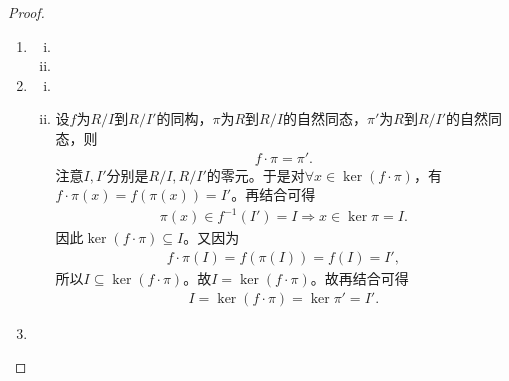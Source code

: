 \documentclass[../../main.tex]{subfiles}%
\begin{document}
\begin{proof}
\begin{enumerate}[(1)]
\item \begin{enumerate}[(i)]
\item 

\item 
\end{enumerate}


\item \begin{enumerate}[(i)]
\item 

\item 设$f$为$R/I$到$R/I'$的同构，$\pi$为$R$到$R/I$的自然同态，$\pi'$为$R$到$R/I'$的自然同态，则
\begin{align*}
f\cdot \pi =\pi'.
\end{align*}
注意$I,I'$分别是$R/I,R/I'$的零元。于是对$\forall x\in \ker\left( f\cdot \pi \right)$，有$f\cdot \pi \left( x \right) =f\left( \pi \left( x \right) \right) =I'$。再结合可得
\begin{align*}
\pi \left( x \right) \in f^{-1}\left( I' \right) =I\Longrightarrow x\in \ker\pi =I.
\end{align*}
因此$\ker\left( f\cdot \pi \right) \subseteq I$。又因为
\begin{align*}
f\cdot \pi \left( I \right) =f\left( \pi \left( I \right) \right) =f\left( I \right) =I',
\end{align*}
所以$I\subseteq \ker\left( f\cdot \pi \right)$。故$I=\ker\left( f\cdot \pi \right)$。故再结合可得
\begin{align*}
I=\ker\left( f\cdot \pi \right) =\ker\pi' =I'.
\end{align*}
\end{enumerate}

\item 
\end{enumerate}

\end{proof}
\end{document}

